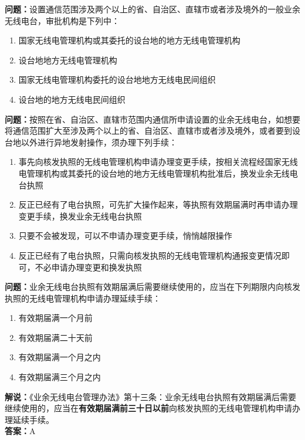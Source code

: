 \textbf{问题：}设置通信范围涉及两个以上的省、自治区、直辖市或者涉及境外的一般业余无线电台，审批机构是下列中：
\begin{enumerate}[label=\Alph*), leftmargin=1cm]
	\item 国家无线电管理机构或其委托的设台地的地方无线电管理机构
	\item 设台地地方无线电管理机构
	\item 国家无线电管理机构委托的设台地地方无线电民间组织
	\item 设台地的地方无线电民间组织
\end{enumerate}

\textbf{问题：}按照在省、自治区、直辖市范围内通信所申请设置的业余无线电台，如想要将通信范围扩大至涉及两个以上的省、自治区、直辖市或者涉及境外，或者要到设台地以外进行异地发射操作，须办理下列手续：
\begin{enumerate}[label=\Alph*), leftmargin=1cm]
	\item 事先向核发执照的无线电管理机构申请办理变更手续，按相关流程经国家无线电管理机构或其委托的设台地的地方无线电管理机构批准后，换发业余无线电台执照
	\item 反正已经有了电台执照，可先扩大操作起来，等执照有效期届满时再申请办理变更手续，换发业余无线电台执照
	\item 只要不会被发现，可以不申请办理变更手续，悄悄越限操作
	\item 反正已经有了电台执照，只需向核发执照的无线电管理机构通报变更情况即可，不必申请办理变更和换发执照
\end{enumerate}

\textbf{问题：}业余无线电台执照有效期届满后需要继续使用的，应当在下列期限内向核发执照的无线电管理机构申请办理延续手续：
\begin{enumerate}[label=\Alph*), leftmargin=1cm]
	\item 有效期届满一个月前
	\item 有效期届满二十天前
	\item 有效期届满一个月之内
	\item 有效期届满三个月之内
\end{enumerate}
\textbf{解说：}《业余无线电台管理办法》第十三条：业余无线电台执照有效期届满后需要继续使用的，应当在\textbf{有效期届满前三十日以前}向核发执照的无线电管理机构申请办理延续手续。\\\textbf{答案：}A %

